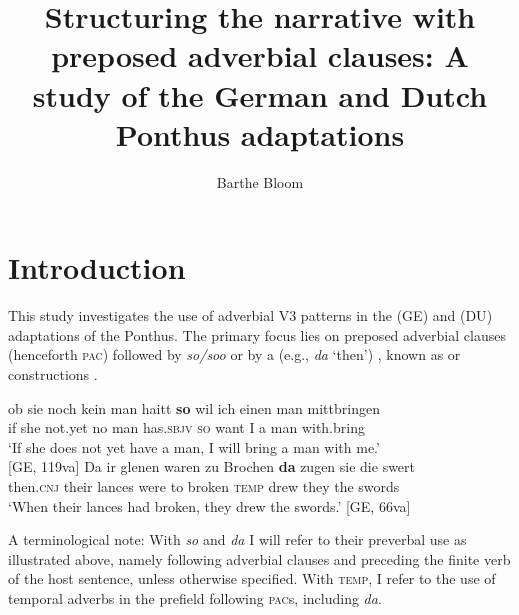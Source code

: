 \documentclass[output=paper,colorlinks,citecolor=brown]{langscibook}
\author{Barthe Bloom\orcid{0000-0003-3378-9856}\affiliation{Universität Potsdam}}
\title[Structuring the narrative with preposed adverbial clauses]{Structuring the narrative with preposed adverbial clauses: A study of the German and Dutch Ponthus adaptations}
\begin{document}
\maketitle

\section{Introduction}
This study investigates the use of adverbial V3 patterns in the  ({GE}) and  ({DU}) adaptations of the Ponthus. The primary focus lies on preposed adverbial clauses (henceforth \textsc{pac}) followed by \textit{so/soo}  or by a   (e.g., \textit{da} `then') , known as  or  constructions \citep[e.g., ][]{Pittner1999, Meklenborg2020, Axel2023}. 

\ea
\ea \label{ex:bloom:1}
\gll ob sie noch kein man haitt \textbf{so} wil ich einen man mittbringen 
\\
if she not.yet no man has.\textsc{sbjv} \textsc{so} want I a man with.bring\\
\glt `If she does not yet have a man, I will bring a man with me.'\\ \hfill [GE, 119va]
\ex \label{ex:bloom:2}
\gll Da ir glenen waren zu Brochen \textbf{da} zugen sie die swert\\
then.\textsc{cnj} their lances were to broken \textsc{temp} drew they the swords\\
\glt `When their lances had broken, they drew the swords.' \hfill [GE, 66va]
\z
\z

\noindent A terminological note: With \textit{so} and \textit{da} I will refer to their preverbal use as illustrated above, namely following adverbial clauses and preceding the finite verb of the host sentence, unless otherwise specified. With \textsc{temp}, I refer to the use of temporal adverbs in the prefield following \textsc{pac}s, including \textit{da}.
\end{document}
